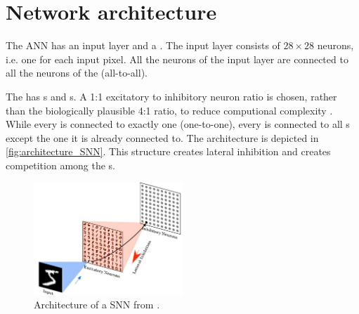 \section{Network architecture}
\label{subsec:architecture}


The \ac{ANN} has an input layer and a \pLayer{} \cite{SNN}.
The input layer consists of $28 \times 28$ neurons, i.e. one for each input pixel.
All the neurons of the input layer are connected to all the neurons of the \pLayer{} (all-to-all).

The \pLayer{} has \eN{}s and \iN{}s.
A 1:1 excitatory to inhibitory neuron ratio is chosen, rather than the biologically plausible 4:1 ratio, 
to reduce computional complexity \cite{SNN}.
While every \eN{} is connected to exactly one \iN{} (one-to-one), every \iN{} is connected to all \eN{}s except the one it is already connected to.
The architecture is depicted in \autoref{fig:architecture_SNN}.
This structure creates lateral inhibition and creates competition among the \eN{}s.

\begin{figure}[htbp]
    \center
    \includegraphics[width=0.5\textwidth]{pictures/architecture_SNN_erste_Quelle.jpg}
    \caption{Architecture of a \ac{SNN} from \cite{SNN}.}
    \label{fig:architecture_SNN}
\end{figure}